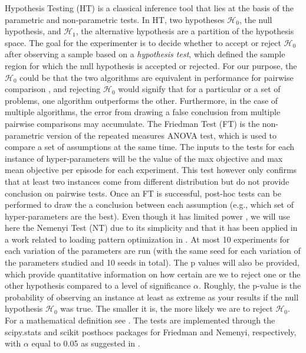 \documentclass[a4paper]{article}
\begin{document}
 Hypothesis Testing (HT) \cite{casella2002statistical,derrac2011apractical} is a classical inference tool that lies at the basis of the parametric and non-parametric tests. In HT, two hypotheses $\mathcal{H}_0$, the null hypothesis, and $\mathcal{H}_1$, the alternative hypothesis are a partition of the hypothesis space. The goal for the experimenter is to decide whether to accept or reject $\mathcal{H}_0$ after observing a sample based on a \textit{hypothesis test}, which defined the sample region for which the null hypothesis is accepted or rejected. For our purpose, the $\mathcal{H}_0$ could be that the two algorithms are equivalent in performance for pairwise comparison \cite{derrac2011apractical}, and rejecting $\mathcal{H}_0$ would signify that for a particular or a set of problems, one algorithm outperforms the other. Furthermore, in the case of multiple algorithms, the error from drawing a false conclusion from multiple pairwise comparisons may accumulate. The Friedman Test (FT) \cite{derrac2011apractical} is the non-parametric version of the repeated measures ANOVA \cite{casella2002statistical,derrac2011apractical} test, which is used to compare a set of assumptions at the same time. The inputs to the tests for each instance of hyper-parameters will be the value of the max objective and max mean objective per episode for each experiment. This test however only confirms that at least two instances come from different distribution but do not provide conclusion on pairwise tests. Once an FT is successful, post-hoc tests can be performed \cite{derrac2011apractical} to draw the a conclusion between each assumption (e.g., which set of hyper-parameters are the best). Even though it has limited power \cite{derrac2011apractical}, we will use here the Nemenyi Test (NT) due to its simplicity and that it has been applied in a work related to loading pattern optimization in \cite{schlunz2016acomparative}. At most 10 experiments for each variation of the parameters are run (with the same seed for each variation of the parameters studied and 10 seeds in total). The p values will also be provided, which provide quantitative information on how certain are we to reject one or the other hypothesis compared to a level of significance $\alpha$. Roughly, the p-value is the probability of observing an instance at least as extreme as your results if the null hypothesis $\mathcal{H}_0$ was true. The smaller it is, the more likely we are to reject $\mathcal{H}_0$. For a mathematical definition see \cite{casella2002statistical}. The tests are implemented through the scipy.stats \cite{2020SciPy-NMeth} and scikit posthocs \cite{Terpilowski2019} packages for Friedman and Nemenyi, respectively, with $\alpha$ equal to 0.05 as suggested in \cite{schlunz2016acomparative}. 
\end{document}
